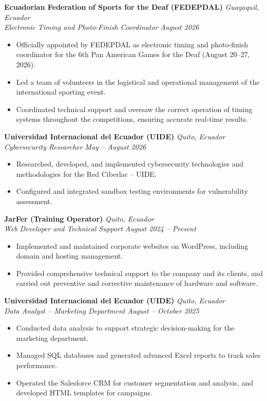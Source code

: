 \documentclass[10.5pt]{article}
\begin{document}
\vspace{0.3em}
\textbf{Ecuadorian Federation of Sports for the Deaf (FEDEPDAL)} \hfill \textit{Guayaquil, Ecuador}\\
\textit{Electronic Timing and Photo-Finish Coordinator} \hfill \textit{August 2026}
\begin{itemize}
    \item Officially appointed by FEDEPDAL as electronic timing and photo-finish coordinator for the 6th Pan American Games for the Deaf (August 20--27, 2026).
    \item Led a team of volunteers in the logistical and operational management of the international sporting event.
    \item Coordinated technical support and oversaw the correct operation of timing systems throughout the competitions, ensuring accurate real-time results.
\end{itemize}

\vspace{0.3em}
\textbf{Universidad Internacional del Ecuador (UIDE)} \hfill \textit{Quito, Ecuador}\\
\textit{Cybersecurity Researcher} \hfill \textit{May -- August 2026}
\begin{itemize}
    \item Researched, developed, and implemented cybersecurity technologies and methodologies for the Red Ciberlac -- UIDE.
    \item Configured and integrated sandbox testing environments for vulnerability assessment.
\end{itemize}

\vspace{0.3em}
\textbf{JarFer (Training Operator)} \hfill \textit{Quito, Ecuador}\\
\textit{Web Developer and Technical Support} \hfill \textit{August 2024 -- Present}
\begin{itemize}
    \item Implemented and maintained corporate websites on WordPress, including domain and hosting management.
    \item Provided comprehensive technical support to the company and its clients, and carried out preventive and corrective maintenance of hardware and software.
\end{itemize}

\vspace{0.3em}
\textbf{Universidad Internacional del Ecuador (UIDE)} \hfill \textit{Quito, Ecuador}\\
\textit{Data Analyst -- Marketing Department} \hfill \textit{August -- October 2025}
\begin{itemize}
    \item Conducted data analysis to support strategic decision-making for the marketing department.
    \item Managed SQL databases and generated advanced Excel reports to track sales performance.
    \item Operated the Salesforce CRM for customer segmentation and analysis, and developed HTML templates for campaigns.
\end{itemize}
\end{document}
